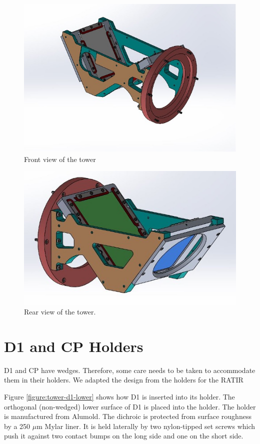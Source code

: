\documentclass{report}
\newcommand{\micron}{\mbox{$\mu$m}}
\begin{document}
\begin{figure}
\begin{center}
\includegraphics[width=0.7\linewidth]{figures/tower-front.jpg}
\end{center}
\caption{Front view of the tower}
\label{figure:tower-front}
\end{figure}

\begin{figure}
\begin{center}
\includegraphics[width=0.7\linewidth]{figures/tower-rear.jpg}
\end{center}
\caption{Rear view of the tower.}
\label{figure:tower-rear}
\end{figure}

\section{D1 and CP Holders}

D1 and CP have  wedges. Therefore, some care needs to be taken to accommodate them in their holders. We adapted the design from the holders for the RATIR 

Figure \ref{figure:tower-d1-lower} shows how D1 is inserted into its holder. The orthogonal (non-wedged) lower surface of D1 is placed into the holder. The holder is manufactured from Alumold. The dichroic is protected from surface roughness by a 250 {\micron} Mylar liner. It is held laterally by two nylon-tipped set screws which push it against two contact bumps on the long side and one on the short side. 
\end{document}
